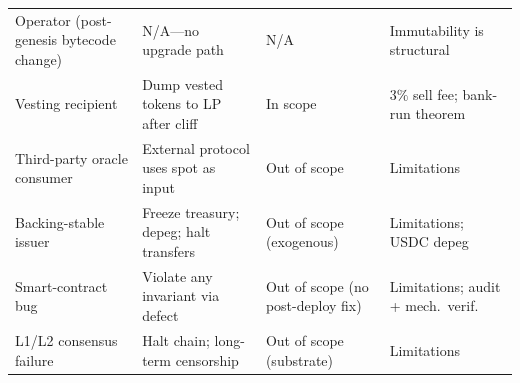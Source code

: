 \documentclass[11pt,a4paper]{article}
\begin{document}
\begin{table}[h]
\begin{tabular}{p{2.4cm} p{4.6cm} p{1.9cm} p{4.0cm}}
Operator (post-genesis bytecode change) & N/A---no upgrade path & N/A & Immutability is structural \\
Vesting recipient & Dump vested tokens to LP after cliff & In scope & $3\%$ sell fee; bank-run theorem \\
Third-party oracle consumer & External protocol uses spot as input & Out of scope & Limitations \\
Backing-stable issuer & Freeze treasury; depeg; halt transfers & Out of scope (exogenous) & Limitations; USDC depeg \\
Smart-contract bug & Violate any invariant via defect & Out of scope (no post-deploy fix) & Limitations; audit + mech.\ verif. \\
L1/L2 consensus failure & Halt chain; long-term censorship & Out of scope (substrate) & Limitations \\
\bottomrule
\end{tabular}
\end{table}
\end{document}
